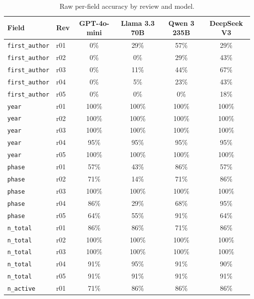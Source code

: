 \documentclass[a4paper,fleqn]{cas-sc}
\begin{document}
\begin{table}[ht]
\caption{Raw per-field accuracy by review and model.}
\label{tbl:appendix}
\small
\begin{tabular*}{\tblwidth}{@{}p{3.6cm}p{0.6cm}cccc@{}}
\toprule
Field & Rev & GPT-4o-mini & Llama 3.3 70B & Qwen 3 235B & DeepSeek V3 \\
\midrule
\texttt{first\_author}      & r01 & 0\%   & 29\%  & 57\%  & 29\%  \\
\texttt{first\_author}      & r02 & 0\%   & 0\%   & 29\%  & 43\%  \\
\texttt{first\_author}      & r03 & 0\%   & 11\%  & 44\%  & 67\%  \\
\texttt{first\_author}      & r04 & 0\%   & 5\%   & 23\%  & 43\%  \\
\texttt{first\_author}      & r05 & 0\%   & 0\%   & 0\%   & 18\%  \\
\midrule
\texttt{year}               & r01 & 100\% & 100\% & 100\% & 100\% \\
\texttt{year}               & r02 & 100\% & 100\% & 100\% & 100\% \\
\texttt{year}               & r03 & 100\% & 100\% & 100\% & 100\% \\
\texttt{year}               & r04 & 95\%  & 95\%  & 95\%  & 95\%  \\
\texttt{year}               & r05 & 100\% & 100\% & 100\% & 100\% \\
\midrule
\texttt{phase}              & r01 & 57\%  & 43\%  & 86\%  & 57\%  \\
\texttt{phase}              & r02 & 71\%  & 14\%  & 71\%  & 86\%  \\
\texttt{phase}              & r03 & 100\% & 100\% & 100\% & 100\% \\
\texttt{phase}              & r04 & 86\%  & 29\%  & 68\%  & 95\%  \\
\texttt{phase}              & r05 & 64\%  & 55\%  & 91\%  & 64\%  \\
\midrule
\texttt{n\_total}           & r01 & 86\%  & 86\%  & 71\%  & 86\%  \\
\texttt{n\_total}           & r02 & 100\% & 100\% & 100\% & 100\% \\
\texttt{n\_total}           & r03 & 100\% & 100\% & 100\% & 100\% \\
\texttt{n\_total}           & r04 & 91\%  & 95\%  & 91\%  & 90\%  \\
\texttt{n\_total}           & r05 & 91\%  & 91\%  & 91\%  & 91\%  \\
\midrule
\texttt{n\_active}          & r01 & 71\%  & 86\%  & 86\%  & 86\%  \\

\end{tabular*}
\end{table}
\end{document}
